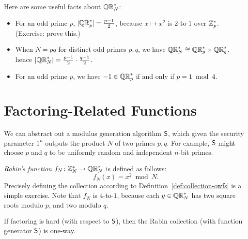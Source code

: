 \documentclass[11pt]{article}
\begin{document}
\noindent Here are some useful facts about $\mathbb{QR}_{N}^{*}$:
\begin{itemize}
\item For an odd prime $p$, $\lvert\mathbb{QR}_{p}^{*}\rvert = \frac{p-1}{2}$, because
  $x \mapsto x^{2}$ is $2$-to-$1$ over $\mathbb{Z}_p^{*}$.  (Exercise: prove
  this.)

\item When $N = pq$ for distinct odd primes $p,q$, we have $\mathbb{QR}_{N}^{*}
  \cong \mathbb{QR}_{p}^{*} \times \mathbb{QR}_{q}^{*}$, hence $\lvert\mathbb{QR}_{N}^{*}\rvert =
  \frac{p-1}{2} \cdot \frac{q-1}{2}$.

\item For an odd prime $p$, we have $-1 \in \mathbb{QR}_{p}^{*}$ if and only if
  $p = 1 \bmod 4$.
\end{itemize}

\section{Factoring-Related Functions}
\label{sec:fact-related}

We can abstract out a modulus generation algorithm $\mathsf{S}$, which
given the security parameter $1^{n}$ outputs the product $N$ of two
primes $p,q$.  For example, $\mathsf{S}$ might choose $p$ and $q$ to be
uniformly random and independent $n$-bit primes.

\emph{Rabin's function} $f_{N} \colon \mathbb{Z}_N^{*} \to \mathbb{QR}_{N}^{*}$ is defined
as follows: \[ f_{N}(x) = x^{2} \bmod N. \] Precisely defining the
collection according to Definition~\ref{def:collection-owfs} is a
simple exercise.  Note that $f_{N}$ is $4$-to-$1$, because each $y \in
\mathbb{QR}_{N}^{*}$ has two square roots modulo $p$, and two modulo $q$.

\begin{theorem}
  \label{thm:rabin-owf-factor}
  If factoring is hard (with respect to $\mathsf{S}$), then the Rabin
  collection (with function generator $\mathsf{S}$) is one-way.
\end{theorem}
\end{document}
